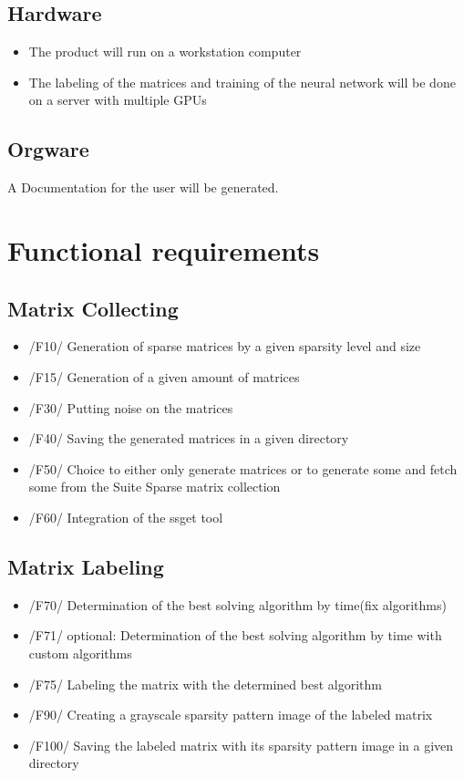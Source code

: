 \documentclass[parskip=full]{scrartcl}
\begin{document}
\subsection{Hardware}

\begin{itemize}
\item The product will run on a workstation computer
\item The labeling of the matrices and training of the \gls{neural network} will be done on a server with multiple \glspl{GPU}
\end{itemize}

\subsection{Orgware}
A Documentation for the user will be generated.


\section{Functional requirements}
\subsection{Matrix Collecting}
	\begin{itemize}
	\item /F10/ Generation of sparse matrices by a given sparsity level and size
	\item /F15/ Generation of a given amount of matrices
	\item /F30/ Putting noise on the matrices
 	\item /F40/ Saving the generated matrices in a given directory
        \item /F50/ Choice to either only generate matrices or to generate some and fetch some from the \gls{Suite Sparse} matrix collection
	\item /F60/ Integration of the \gls{ssget} tool
	\end{itemize}
\subsection{Matrix Labeling}
	\begin{itemize}
	\item /F70/ Determination of the best solving \gls{algorithm} by time(fix \glspl{algorithm})
	\item /F71/ optional: Determination of the best solving \gls{algorithm} by time with custom \glspl{algorithm}
	\item /F75/ Labeling the matrix with the determined best algorithm
	\item /F90/ Creating a grayscale \gls{sparsity pattern image} of the labeled matrix
	\item /F100/ Saving the labeled matrix with its \gls{sparsity pattern image} in a given directory 
	\end{itemize}
	
\end{document}
